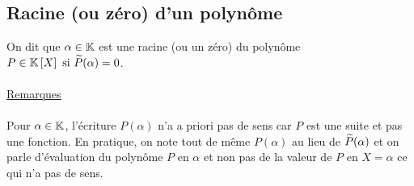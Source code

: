 \subsection{Racine (ou zéro) d’un polynôme}
\begin{defi}
    On dit que \(\alpha \in \mathbb{K}\) est une racine (ou un zéro) du polynôme \(P \in \mathbb{K} \left[X\right] \text{ si } \widetilde{P} (\alpha) = 0\).\\~\\
    \underline{Remarques}\\~\\
    Pour \(\alpha \in \mathbb{K}\), l’écriture \(P (\alpha)\) n’a a priori pas de sens car \(P\) est une suite et pas une fonction. En pratique, on note tout de même \(P (\alpha)\) au lieu de \(\widetilde{P} (\alpha)\) et on parle d’évaluation du polynôme \(P\) en \(\alpha\) et non pas de la valeur de \(P\) en \(X = \alpha\) ce qui n’a pas de sens.
\end{defi}

